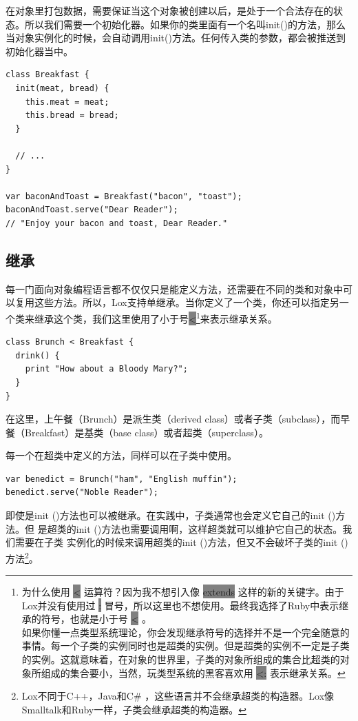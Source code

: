 \documentclass[cn,10pt,math=newtx,citestyle=gb7714-2015,bibstyle=gb7714-2015]{elegantbook}
\begin{document}
在对象里打包数据，需要保证当这个对象被创建以后，是处于一个合法存在的状态。所以我们需要一个初始化器。如果你的类里面有一个名叫init()的方法，那么当对象实例化的时候，会自动调用init()方法。任何传入类的参数，都会被推送到初始化器当中。

\begin{verbatim}
class Breakfast {
  init(meat, bread) {
    this.meat = meat;
    this.bread = bread;
  }

  // ...
}

var baconAndToast = Breakfast("bacon", "toast");
baconAndToast.serve("Dear Reader");
// "Enjoy your bacon and toast, Dear Reader."
\end{verbatim}

\subsection{继承}

每一门面向对象编程语言都不仅仅只是能定义方法，还需要在不同的类和对象中可以复用这些方法。所以，Lox支持单继承。当你定义了一个类，你还可以指定另一个类来继承这个类，我们这里使用了小于号\colorbox{gray}{<}\footnote{为什么使用 \colorbox{gray}{<} 运算符？因为我不想引入像 \colorbox{gray}{extends} 这样的新的关键字。由于Lox并没有使用过 \colorbox{gray}{:} 冒号，所以这里也不想使用。最终我选择了Ruby中表示继承的符号，也就是小于号 \colorbox{gray}{<} 。 \\ 如果你懂一点类型系统理论，你会发现继承符号的选择并不是一个完全随意的事情。每一个子类的实例同时也是超类的实例。但是超类的实例不一定是子类的实例。这就意味着，在对象的世界里，子类的对象所组成的集合比超类的对象所组成的集合要小，当然，玩类型系统的黑客喜欢用 \colorbox{gray}{<:} 表示继承关系。}来表示继承关系。

\begin{verbatim}
class Brunch < Breakfast {
  drink() {
    print "How about a Bloody Mary?";
  }
}
\end{verbatim}

在这里，上午餐（Brunch）是派生类（derived class）或者子类（subclass），而早餐（Breakfast）是基类（base class）或者超类（superclass）。

每一个在超类中定义的方法，同样可以在子类中使用。

\begin{verbatim}
var benedict = Brunch("ham", "English muffin");
benedict.serve("Noble Reader");
\end{verbatim}

即使是init ()方法也可以被继承。在实践中，子类通常也会定义它自己的init ()方法。但
是超类的init ()方法也需要调用啊，这样超类就可以维护它自己的状态。我们需要在子类
实例化的时候来调用超类的init ()方法，但又不会破坏子类的init ()方法\footnote{Lox不同于C++，Java和C\# ，这些语言并不会继承超类的构造器。Lox像Smalltalk和Ruby一样，子类会继承超类的构造器。}。
\end{document}
